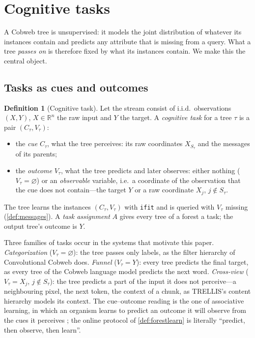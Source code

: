 \documentclass[11pt]{article}
\theoremstyle{definition}
\newtheorem{definition}[theorem]{Definition}
\theoremstyle{remark}
\newcommand{\R}{\mathbb{R}}
\begin{document}
\section{Cognitive tasks}\label{sec:tasks}

A Cobweb tree is unsupervised: it models the joint distribution of whatever its
instances contain and predicts any attribute that is missing from a query.  What a tree
\emph{passes on} is therefore fixed by what its instances contain.  We make this the
central object.

\subsection{Tasks as cues and outcomes}

\begin{definition}[Cognitive task]\label{def:task}
Let the stream consist of i.i.d.\ observations $(X,Y)$, $X\in\R^n$ the raw input and
$Y$ the target.  A \emph{cognitive task} for a tree $\tau$ is a pair $(C_\tau,V_\tau)$:
\begin{itemize}[leftmargin=*]
\item the \emph{cue} $C_\tau$, what the tree perceives: its raw coordinates
  $X_{S_\tau}$ and the messages of its parents;
\item the \emph{outcome} $V_\tau$, what the tree predicts and later observes: either
  nothing ($V_\tau=\varnothing$) or an \emph{observable} variable, i.e.\ a coordinate of
  the observation that the cue does not contain---the target $Y$ or a raw coordinate
  $X_j$, $j\notin S_\tau$.
\end{itemize}
The tree learns the instances $(C_\tau,V_\tau)$ with \texttt{ifit} and is queried with
$V_\tau$ missing (\cref{def:messages}).  A \emph{task assignment} $A$ gives every tree
of a forest a task; the output tree's outcome is $Y$.
\end{definition}

Three families of tasks occur in the systems that motivate this paper.
\emph{Categorization} ($V_\tau=\varnothing$): the tree passes only labels, as the filter
hierarchy of Convolutional Cobweb does.  \emph{Funnel} ($V_\tau=Y$): every tree predicts
the final target, as every tree of the Cobweb language model predicts the next word.
\emph{Cross-view} ($V_\tau=X_j$, $j\notin S_\tau$): the tree predicts a part of the input
it does not perceive---a neighbouring pixel, the next token, the context of a chunk, as
TRELLIS's content hierarchy models its context.  The cue--outcome reading is the one of
associative learning, in which an organism learns to predict an outcome it will observe
from the cues it perceives \citep{rescorla1972}; the online protocol of
\cref{def:forestlearn} is literally ``predict, then observe, then learn''.
\end{document}
